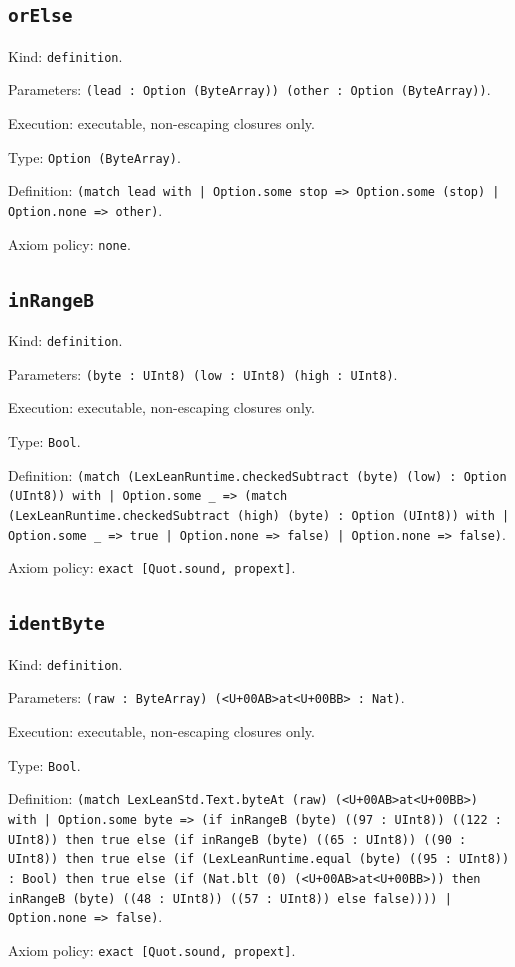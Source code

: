 \documentclass[11pt]{article}
\begin{document}
\subsection*{\texttt{orElse}}
\noindent Kind: \texttt{definition}.\par
\noindent Parameters: \texttt{(lead : Option (ByteArray)) (other : Option (ByteArray))}.\par
\noindent Execution: executable, non-escaping closures only.\par
\noindent Type: \texttt{Option (ByteArray)}.\par
\noindent Definition: \texttt{(match lead with | Option.some stop => Option.some (stop) | Option.none => other)}.\par
\noindent Axiom policy: \texttt{none}.\par
\subsection*{\texttt{inRangeB}}
\noindent Kind: \texttt{definition}.\par
\noindent Parameters: \texttt{(byte : UInt8) (low : UInt8) (high : UInt8)}.\par
\noindent Execution: executable, non-escaping closures only.\par
\noindent Type: \texttt{Bool}.\par
\noindent Definition: \texttt{(match (LexLeanRuntime.checkedSubtract (byte) (low) : Option (UInt8)) with | Option.some \_ => (match (LexLeanRuntime.checkedSubtract (high) (byte) : Option (UInt8)) with | Option.some \_ => true | Option.none => false) | Option.none => false)}.\par
\noindent Axiom policy: \texttt{exact [Quot.sound, propext]}.\par
\subsection*{\texttt{identByte}}
\noindent Kind: \texttt{definition}.\par
\noindent Parameters: \texttt{(raw : ByteArray) (<U+00AB>at<U+00BB> : Nat)}.\par
\noindent Execution: executable, non-escaping closures only.\par
\noindent Type: \texttt{Bool}.\par
\noindent Definition: \texttt{(match LexLeanStd.Text.byteAt (raw) (<U+00AB>at<U+00BB>) with | Option.some byte => (if inRangeB (byte) ((97 : UInt8)) ((122 : UInt8)) then true else (if inRangeB (byte) ((65 : UInt8)) ((90 : UInt8)) then true else (if (LexLeanRuntime.equal (byte) ((95 : UInt8)) : Bool) then true else (if (Nat.blt (0) (<U+00AB>at<U+00BB>)) then inRangeB (byte) ((48 : UInt8)) ((57 : UInt8)) else false)))) | Option.none => false)}.\par
\noindent Axiom policy: \texttt{exact [Quot.sound, propext]}.\par
\end{document}
